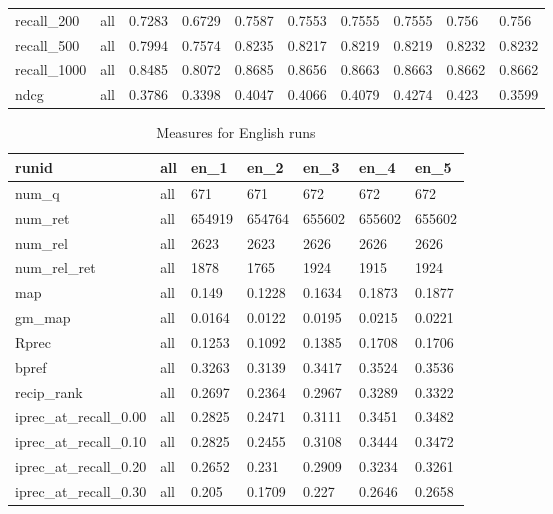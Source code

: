 \begin{table}[h!]
\begin{tabular}{|l|l|l|l|l|l|l|l|l|l|}
        recall\_200 & all & 0.7283 & 0.6729 & 0.7587 & 0.7553 & 0.7555 & 0.7555 & 0.756 & 0.756 \\ 
        recall\_500 & all & 0.7994 & 0.7574 & 0.8235 & 0.8217 & 0.8219 & 0.8219 & 0.8232 & 0.8232 \\ 
        recall\_1000 & all & 0.8485 & 0.8072 & 0.8685 & 0.8656 & 0.8663 & 0.8663 & 0.8662 & 0.8662 \\ \midrule
        ndcg & all & 0.3786 & 0.3398 & 0.4047 & 0.4066 & 0.4079 & 0.4274 & 0.423 & 0.3599 \\
	\bottomrule
    \end{tabular}
\end{table}

\FloatBarrier


\begin{table}[p]
\caption{Measures for English runs}
  \label{tab:all-measures-english}
    \centering
    \begin{tabular}{|l|l|l|l|l|l|l|}
    \toprule
        runid & all & en\_1 & en\_2 & en\_3 & en\_4 & en\_5 \\ \midrule
        num\_q & all & 671 & 671 & 672 & 672 & 672 \\ 
        num\_ret & all & 654919 & 654764 & 655602 & 655602 & 655602 \\ 
        num\_rel & all & 2623 & 2623 & 2626 & 2626 & 2626 \\ 
        num\_rel\_ret & all & 1878 & 1765 & 1924 & 1915 & 1924 \\ \midrule
        map & all & 0.149 & 0.1228 & 0.1634 & 0.1873 & 0.1877 \\ 
        gm\_map & all & 0.0164 & 0.0122 & 0.0195 & 0.0215 & 0.0221 \\ \midrule
        Rprec & all & 0.1253 & 0.1092 & 0.1385 & 0.1708 & 0.1706 \\ 
        bpref & all & 0.3263 & 0.3139 & 0.3417 & 0.3524 & 0.3536 \\ 
        recip\_rank & all & 0.2697 & 0.2364 & 0.2967 & 0.3289 & 0.3322 \\ \midrule
        iprec\_at\_recall\_0.00 & all & 0.2825 & 0.2471 & 0.3111 & 0.3451 & 0.3482 \\ 
        iprec\_at\_recall\_0.10 & all & 0.2825 & 0.2455 & 0.3108 & 0.3444 & 0.3472 \\ 
        iprec\_at\_recall\_0.20 & all & 0.2652 & 0.231 & 0.2909 & 0.3234 & 0.3261 \\ 
        iprec\_at\_recall\_0.30 & all & 0.205 & 0.1709 & 0.227 & 0.2646 & 0.2658 \\ 

\end{tabular}
\end{table}
